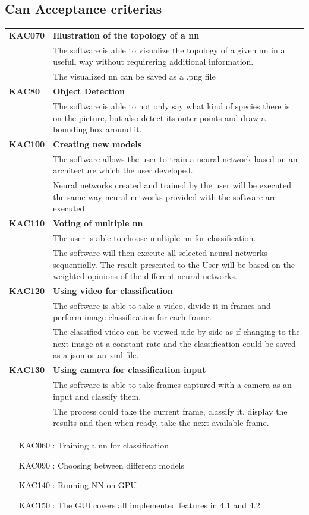 \documentclass[parskip=full]{scrartcl}
\begin{document}
\subsection{Can Acceptance criterias}
\begin{tabular}{p{2cm}p{11.4cm}}
\textbf{KAC070} & \textbf{Illustration of the topology of a nn} \\
& The software is able to visualize the topology of a given nn in a usefull way without requirering additional information. \\
& The visualized nn can be saved as a .png file\\
\textbf{KAC80} & \textbf{Object Detection} \\
&The software is able to not only say what kind of species there is on the picture, but also detect its outer points and draw a bounding box around it. \\ 
\textbf{KAC100} & \textbf{Creating new models} \\
& The software allows the user to train a neural network based on an architecture which the user developed.\\
& Neural networks created and trained by the user will be executed the same way neural networks provided with the software are executed.\\
\textbf{KAC110} & \textbf{Voting of multiple nn} \\
& The user is able to choose multiple nn for classification.\\
& The software will then execute all selected neural networks sequentially. The result presented to the User will be based on the weighted opinions of the different neural networks.\\
\textbf{KAC120} & \textbf{Using video for classification} \\
& The software is able to take a video, divide it in frames and perform image classification for each frame.\\
& The classified video can be viewed side by side as if changing to the next image at a constant rate and the classification could be saved as a \gls{json} or an \gls{xml} file.\\
\textbf{KAC130} & \textbf{Using camera for classification input} \\
& The software is able to take frames captured with a camera as an input and classify them.\\
& The process could take the current frame, classify it, display the results and then when ready, take the next available frame.
\end{tabular}
\begin{itemize}[nosep]
\item [KAC060]: Training a nn for classification
\item [KAC090]: Choosing between different models
\item [KAC140]: Running NN on GPU
\item [KAC150]: The GUI covers all implemented features in 4.1 and 4.2
\end{itemize}
\end{document}
